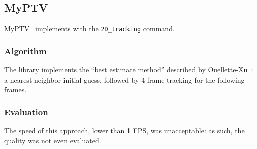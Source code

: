 \subsection{MyPTV}
\label{sec:link2d:myptv}

MyPTV~\cite{myptv} implements \linkDD* with the \texttt{2D\_tracking} command.

\subsubsection{Algorithm}

The library implements the ``best estimate method'' described by Ouellette-Xu~\cite{linkDD-myptv}: a nearest neighbor initial guess, followed by 4-frame tracking for the following frames.

\subsubsection{Evaluation}

The speed of this approach, lower than 1 FPS, was unacceptable: as such, the quality was not even evaluated.
